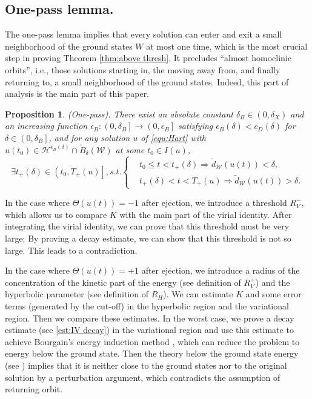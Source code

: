 \documentclass[reqno, 11pt]{amsart}
\numberwithin{equation}{section}
\theoremstyle{plain}
\newtheorem{proposition}[theorem]{Proposition}
\theoremstyle{definition}
\numberwithin{equation}{section}
\numberwithin{theorem}{section}
\numberwithin{equation}{section}
\numberwithin{equation}{section}
\numberwithin{theorem}{section}
\begin{document}
	
	
	
	\subsection{One-pass lemma.} The one-pass lemma implies that every solution can enter and exit a small neighborhood of the ground states $W$ at most one time, which is the most crucial step in proving Theorem \ref{thm:above thresh}. It precludes “almost homoclinic orbits”, i.e., those solutions starting in, the moving away from, and finally returning to, a small neighborhood of the ground states. Indeed, this part of analysis is the main part of this paper. 
	
	
	\begin{proposition}(One-pass)\label{prop:one pass}. There exist an absolute constant $\delta_{B}\in(0,\delta_{X})$ and an increasing function $\epsilon_{B}:\left( 0,\delta_{B} \right] \rightarrow \left(0,\epsilon_{B} \right]$ satisfying $\epsilon_{B}(\delta)<c_D(\delta)$ for $\delta\in \left(0, \delta_{B} \right]$, and for any solution $u$ of \eqref{equ:Hart} with $u(t_0)\in \mathcal{H}^{\epsilon_{B}(\delta)}\cap \widetilde{B}_{\delta}(\mathcal{W})$ at some $t_0\in I(u)$,
		\begin{equation}\label{one-pass}
		\exists t_{+}(\delta)\in\left( t_0,T_{+}(u) \right], s.t. \left\{\begin{aligned}
		&t_0\leq t < t_{+}(\delta) \Longrightarrow \widetilde{d}_{\mathcal{W}}(u(t))<\delta ,\\
		&t_{+}(\delta)<t<T_{+}(u) \Longrightarrow \widetilde{d}_{\mathcal{W}}(u(t))>\delta.\end{aligned}\right.
		\end{equation}
	\end{proposition} 
	In the case where $\Theta(u(t))=-1$ after ejection, we introduce a threshold $R_{V}^{-}$, which allows us to compare $K$ with the main part of the virial identity. After integrating the virial identity, we can prove that this threshold must be very large; By proving a decay estimate, we can show that this threshold is not so large. This leads to a contradiction.
	
	In the case where $\Theta(u(t))=+1$ after ejection, we introduce a radius of the concentration of the kinetic part of the energy (see definition of $R_{V}^{+}$) and the hyperbolic parameter (see definition of $R_H$). We can estimate $K$ and some error terms (generated by the cut-off) in the hyperbolic region and the variational region. Then we compare these estimates. In the worst case, we prove a decay estimate (see \eqref{est:IV decay}) in the variational region and use this estimate to achieve Bourgain's energy induction method \cite{Bourg}, which can reduce the problem to energy below the ground state. Then the theory below the ground state energy (see \cite{MXZ:crit Hart:f rad}) implies that it is neither close to the ground states nor to the original solution by a perturbation argument, which contradicts the assumption of returning orbit.
	
\end{document}
